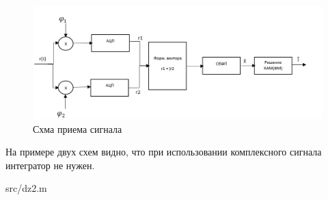 	\begin{figure}[h!]
		\centering
		\includegraphics[scale=0.4]{img/Glebov_3.png}
		\caption{Схма приема сигнала}
		\label{Glebov.image4}
	\end{figure}

	На примере двух схем видно, что при использовании комплексного сигнала интегратор не нужен.
	
	

{src/dz2.m}